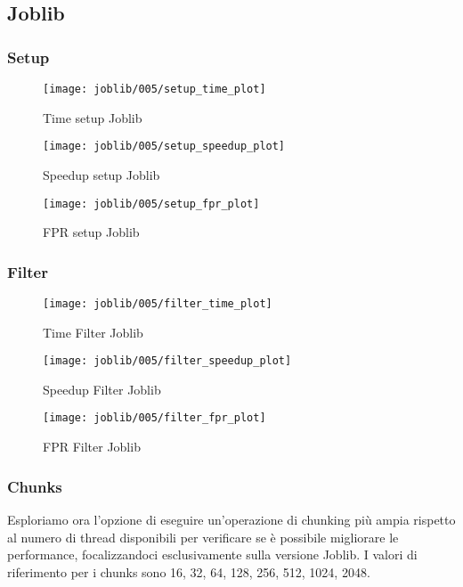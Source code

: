 \subsection{Joblib}\label{subsec:joblib-test}
\subsubsection{Setup}\label{subsubsec:joblib-setup}
\begin{figure}[H]
    \centering
    \texttt{[image: joblib/005/setup\_time\_plot]}
        \caption{Time setup Joblib}\label{fig:005-setup_time_joblib}
    \endminipage\hfill
    \texttt{[image: joblib/005/setup\_speedup\_plot]}
        \caption{Speedup setup Joblib}\label{fig:005-setup_speedup_joblib}
    \endminipage\hfill
\end{figure}
\begin{figure}[H]
    \centering
    \texttt{[image: joblib/005/setup\_fpr\_plot]}
        \caption{FPR setup Joblib}\label{fig:005-setup_fpr_joblib}
    \endminipage\hfill
\end{figure}

\subsubsection{Filter}\label{subsubsec:joblib-filter}
\begin{figure}
    \centering
    \texttt{[image: joblib/005/filter\_time\_plot]}
        \caption{Time Filter Joblib}\label{fig:005-filter_time_joblib}
    \endminipage\hfill
    \texttt{[image: joblib/005/filter\_speedup\_plot]}
        \caption{Speedup Filter Joblib}\label{fig:005-filter_speedup_joblib}
    \endminipage\hfill
\end{figure}
\begin{figure}[H]
    \centering
    \texttt{[image: joblib/005/filter\_fpr\_plot]}
        \caption{FPR Filter Joblib}\label{fig:005-filter_fpr_joblib}
    \endminipage\hfill
\end{figure}

\subsubsection{Chunks}\label{subsubsec:005-chunks}
Esploriamo ora l'opzione di eseguire un'operazione di chunking più ampia rispetto al numero di thread disponibili per
verificare se è possibile migliorare le performance, focalizzandoci esclusivamente sulla versione Joblib.
I valori di riferimento per i chunks sono 16, 32, 64, 128, 256, 512, 1024, 2048.

